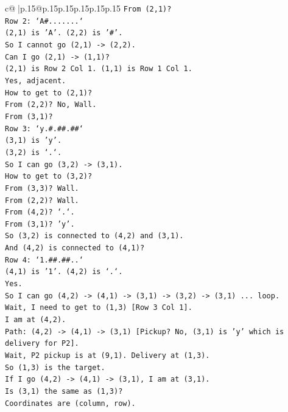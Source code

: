 \documentclass{article}
\begin{document}
{\begin{supertabular}{c@{$\;$}|p{.15\linewidth}@{}p{.15\linewidth}p{.15\linewidth}p{.15\linewidth}p{.15\linewidth}p{.15\linewidth}}
{{{\texttt{From (2,1)?} \\
\texttt{Row 2: `A\#.......`} \\
\texttt{(2,1) is 'A'. (2,2) is '\#'.} \\
\texttt{So I cannot go (2,1) {-}> (2,2).} \\
\texttt{Can I go (2,1) {-}> (1,1)?} \\
\texttt{(2,1) is Row 2 Col 1. (1,1) is Row 1 Col 1.} \\
\texttt{Yes, adjacent.} \\
\texttt{How to get to (2,1)?} \\
\texttt{From (2,2)? No, Wall.} \\
\texttt{From (3,1)?} \\
\texttt{Row 3: `y.\#.\#\#.\#\#`} \\
\texttt{(3,1) is 'y'.} \\
\texttt{(3,2) is `.`.} \\
\texttt{So I can go (3,2) {-}> (3,1).} \\
\texttt{How to get to (3,2)?} \\
\texttt{From (3,3)? Wall.} \\
\texttt{From (2,2)? Wall.} \\
\texttt{From (4,2)? `.`.} \\
\texttt{From (3,1)? 'y'.} \\
\texttt{So (3,2) is connected to (4,2) and (3,1).} \\
\texttt{And (4,2) is connected to (4,1)?} \\
\texttt{Row 4: `1.\#\#.\#\#..`} \\
\texttt{(4,1) is '1'. (4,2) is `.`.} \\
\texttt{Yes.} \\
\texttt{So I can go (4,2) {-}> (4,1) {-}> (3,1) {-}> (3,2) {-}> (3,1) ... loop.} \\
\texttt{Wait, I need to get to (1,3) {[}Row 3 Col 1{]}.} \\
\texttt{I am at (4,2).} \\
\texttt{Path: (4,2) {-}> (4,1) {-}> (3,1) {[}Pickup? No, (3,1) is 'y' which is delivery for P2{]}.} \\
\texttt{Wait, P2 pickup is at (9,1). Delivery at (1,3).} \\
\texttt{So (1,3) is the target.} \\
\texttt{If I go (4,2) {-}> (4,1) {-}> (3,1), I am at (3,1).} \\
\texttt{Is (3,1) the same as (1,3)?} \\
\texttt{Coordinates are (column, row).} \\
}}}
\end{supertabular}}
\end{document}
